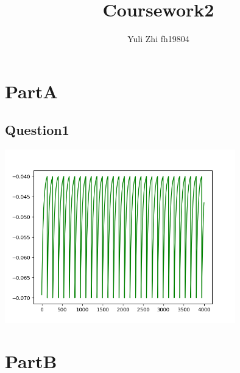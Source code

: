 \documentclass[fleqn,11pt]{article}
\begin{document}
\title{Coursework2}
\author{Yuli Zhi fh19804}
\date{}
\maketitle
\section*{PartA}
\subsection*{Question1}

\begin{center} 
    \includegraphics[width=10cm]{graphs/Question1.png}
\end{center}

\section*{PartB}
\end{document}
